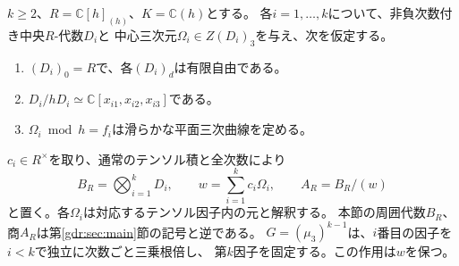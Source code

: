 $k\ge2$、$R=\mathbb C[h]_{(h)}$、$K=\mathbb C(h)$とする。
各$i=1,\ldots,k$について、非負次数付き中央$R$-代数$D_i$と
中心三次元$\Omega_i\in Z(D_i)_3$を与え、次を仮定する。
\begin{enumerate}
\item $(D_i)_0=R$で、各$(D_i)_d$は有限自由である。
\item $D_i/hD_i\simeq\mathbb C[x_{i1},x_{i2},x_{i3}]$である。
\item $\Omega_i\bmod h=f_i$は滑らかな平面三次曲線を定める。
\end{enumerate}
$c_i\in R^\times$を取り、通常のテンソル積と全次数により
\begin{equation}\label{med:eq:multiblock-input}
 B_R=\bigotimes_{i=1}^kD_i,\qquad
 w=\sum_{i=1}^k c_i\Omega_i,\qquad A_R=B_R/(w)
\end{equation}
と置く。各$\Omega_i$は対応するテンソル因子内の元と解釈する。
本節の周囲代数$B_R$、商$A_R$は第\ref{gdr:sec:main}節の記号と逆である。
$G=(\mu_3)^{k-1}$は、$i$番目の因子を$i<k$で独立に次数ごと三乗根倍し、
第$k$因子を固定する。この作用は$w$を保つ。

